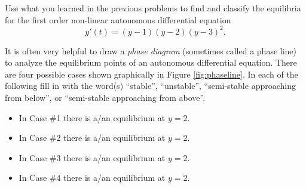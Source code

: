 \begin{problem}
    Use what you learned in the previous problems to find and classify the equilibria for the
    first order non-linear autonomous differential equation
    \[ y'(t) = (y-1)(y-2)(y-3)^2. \]
\end{problem}

\begin{technique}
    It is often very helpful to draw a {\it phase diagram} (sometimes called a phase line)
    to analyze the equilibrium points of an autonomous differential equation.  There are
    four possible cases shown graphically in Figure \ref{fig:phaseline}.  In each of the
    following fill in with the word(s) ``stable'', ``unstable'', ``semi-stable approaching
    from below'', or ``semi-stable approaching from above''.
    \begin{itemize}
        \item In Case \#1 there is a/an \underline{\hspace{1.5in}} equilibrium at $y=2$.
        \item In Case \#2 there is a/an \underline{\hspace{1.5in}} equilibrium at $y=2$.
        \item In Case \#3 there is a/an \underline{\hspace{1.5in}} equilibrium at $y=2$.
        \item In Case \#4 there is a/an \underline{\hspace{1.5in}} equilibrium at $y=2$.
    \end{itemize}
\end{technique}

